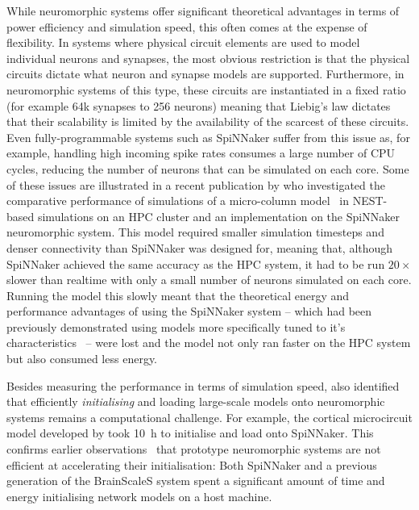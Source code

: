 \documentclass[utf8]{frontiersSCNS} %
\begin{document}
While neuromorphic systems offer significant theoretical advantages in terms of power efficiency and simulation speed, this often comes at the expense of flexibility.
In systems where physical circuit elements are used to model individual neurons and synapses, the most obvious restriction is that the physical circuits dictate what neuron and synapse models are supported.
Furthermore, in neuromorphic systems of this type, these circuits are instantiated in a fixed ratio (for example 64k synapses to 256 neurons) meaning that Liebig's law dictates that their scalability is limited by the availability of the scarcest of these circuits.
Even fully-programmable systems such as SpiNNaker suffer from this issue as, for example, handling high incoming spike rates consumes a large number of CPU cycles, reducing the number of neurons that can be simulated on each core.
Some of these issues are illustrated in a recent publication by \citet{VanAlbada2018} who investigated the comparative performance of simulations of a micro-column model~\citep{Potjans2012} in NEST-based simulations on an HPC cluster and an implementation on the SpiNNaker neuromorphic system.
This model required smaller simulation timesteps and denser connectivity than SpiNNaker was designed for, meaning that, although SpiNNaker achieved the same accuracy as the HPC system, it had to be run $20\times$ slower than realtime with only a small number of neurons simulated on each core. 
Running the model this slowly meant that the theoretical energy and performance advantages of using the SpiNNaker system -- which had been previously demonstrated using models more specifically tuned to it's characteristics~\citep{Sharp2012,Sharp2014,Knight2016} -- were lost and the model not only ran faster on the HPC system but also consumed less energy.

Besides measuring the performance in terms of simulation speed, \citet{VanAlbada2018} also identified that efficiently \textit{initialising} and loading large-scale models onto neuromorphic systems remains a computational challenge. 
For example, the cortical microcircuit model developed by \citet{Potjans2012} took \SI{10}{\hour} to initialise and load onto SpiNNaker.
This confirms earlier observations~\citep{Diamond2018} that prototype neuromorphic systems are not efficient at accelerating their initialisation: Both SpiNNaker and a previous generation of the BrainScaleS system spent a significant amount of time and energy initialising network models on a host machine. 
\end{document}
